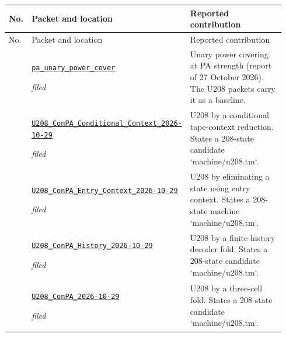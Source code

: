 {\small
\setlength{\tabcolsep}{4pt}
\begin{longtable}{@{}>{\raggedright\arraybackslash}p{0.035\linewidth}>{\raggedright\arraybackslash}p{0.345\linewidth}>{\raggedright\arraybackslash}p{0.56\linewidth}@{}}
\toprule No. & Packet and location & Reported contribution\\\midrule\endfirsthead
\toprule No. & Packet and location & Reported contribution\\\midrule\endhead
1 & \href{https://github.com/VladimirReshetnikov/ProveIt/blob/1c9524d8bf2e0a27b9a16ff622359927f536e663/Computability/BusyBeaver/Research/PA/docs/pa_unary_power_cover/README.txt}{\nolinkurl{pa_unary_power_cover}}\par\emph{filed} & Unary power covering at PA strength (report of 27 October 2026). The U208 packets carry it as a baseline.\\[4pt]
2 & \href{https://github.com/VladimirReshetnikov/ProveIt/blob/1c9524d8bf2e0a27b9a16ff622359927f536e663/Computability/BusyBeaver/Research/PA/docs/U208_ConPA_Conditional_Context_2026-10-29/README.txt}{\nolinkurl{U208_ConPA_Conditional_Context_2026-10-29}}\par\emph{filed} & U208 by a conditional tape-context reduction. States a 208-state candidate `machine/u208.tm`.\\[4pt]
3 & \href{https://github.com/VladimirReshetnikov/ProveIt/blob/1c9524d8bf2e0a27b9a16ff622359927f536e663/Computability/BusyBeaver/Research/PA/docs/U208_ConPA_Entry_Context_2026-10-29/README.txt}{\nolinkurl{U208_ConPA_Entry_Context_2026-10-29}}\par\emph{filed} & U208 by eliminating a state using entry context. States a 208-state machine `machine/u208.tm`.\\[4pt]
4 & \href{https://github.com/VladimirReshetnikov/ProveIt/blob/1c9524d8bf2e0a27b9a16ff622359927f536e663/Computability/BusyBeaver/Research/PA/docs/U208_ConPA_History_2026-10-29/README.md}{\nolinkurl{U208_ConPA_History_2026-10-29}}\par\emph{filed} & U208 by a finite-history decoder fold. States a 208-state candidate `machine/u208.tm`.\\[4pt]
5 & \href{https://github.com/VladimirReshetnikov/ProveIt/blob/1c9524d8bf2e0a27b9a16ff622359927f536e663/Computability/BusyBeaver/Research/PA/docs/U208_ConPA_2026-10-29/README.txt}{\nolinkurl{U208_ConPA_2026-10-29}}\par\emph{filed} & U208 by a three-cell fold. States a 208-state candidate `machine/u208.tm`.\\[4pt]

\end{longtable}}

